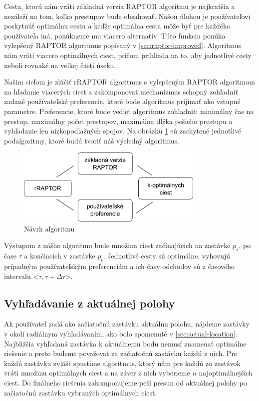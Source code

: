 Cesta, ktorú nám vráti základná verzia RAPTOR algoritmu je najkratšia a nezáleží na tom, koľko prestupov bude obsahovať. Našou úlohou je používateľovi poskytnúť optimálnu cestu a keďže optimálna cesta môže byť pre každého používateľa iná, ponúkneme mu viacero alternatív.  Túto funkciu ponúka vylepšený RAPTOR algoritmus popísaný v \ref{sec:raptor-improved}. Algoritmus nám vráti viacero optimálnych ciest, pričom prihliada na to, aby jednotlivé cesty neboli rovnaké na veľkej časti úseku.

Našim cieľom je zlúčiť rRAPTOR algoritmus s vylepšeným RAPTOR algoritmom na hľadanie viacerých ciest a zakomponovať mechanizmus schopný zohľadniť zadané používateľské preferencie, ktoré bude algoritmus prijímať ako vstupné parametre. Preferencie, ktoré bude vedieť algoritmus zohľadniť: minimálny čas na prestup, maximálny počet prestupov, maximálna dĺžka pešieho prestupu a vyhľadanie len nízkopodlažných spojov. Na obrázku \ref{fig:algorithm} sú zachytené jednotlivé podalgoritmy, ktoré budú tvoriť náš výsledný algoritmus.

\begin{figure}[H]
\centerline{\includegraphics[width=0.8\textwidth]{images/algorithm}}
\caption[Návrh algoritmu]{Návrh algoritmu}
\label{fig:algorithm}
\end{figure}

Výstupom z nášho algoritmu bude množina ciest začínajúcich na zastávke $p_s$, po čase $\tau$ a končiacich v zastávke $p_t$. Jednotlivé cesty sú optimálne, vyhovujú prípadným používateľským preferenciám a ich časy odchodov sú z časového intervalu <$\tau, \tau + \Delta \tau$>. 

\subsection{Vyhľadávanie z aktuálnej polohy}
Ak používateľ zadá ako začiatočnú zastávku aktuálnu polohu, nájdeme zastávky v okolí radiálnym vyhľadávaním, ako bolo spomenuté v \ref{sec:actual-location}. Najbližšia vyhľadaná zastávka k aktuálnemu bodu nemusí znamenať optimálne riešenie a preto budeme považovať za začiatočnú zastávku každú z nich. Pre každú zastávku zvlášť spustíme algoritmus, ktorý nám pre každú zo zastávok vráti množinu optimálnych ciest a na záver z nich vyberieme $n$ najoptimálnejších ciest. Do finálneho riešenia zakomponujeme peší presun od aktuálnej polohy po začiatočnú zastávku vybraných optimálnych ciest.

